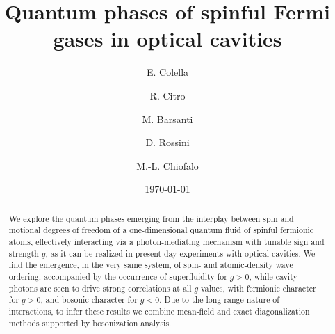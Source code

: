 \documentclass[pra,aps,superscriptaddress,twocolumn]{revtex4}
\begin{document}
\title{Quantum phases of spinful Fermi gases in optical cavities}

\author{E. Colella}

\author{R. Citro}

\author{M. Barsanti}

\author{D. Rossini}

\author{M.-L. Chiofalo}

\begin{abstract}
  We explore the quantum phases emerging from the interplay between spin and motional degrees of freedom of a
  one-dimensional quantum fluid of spinful fermionic atoms, effectively interacting via a photon-mediating mechanism with tunable sign and strength $g$,
  as it can be realized in present-day experiments with optical cavities. We find the emergence, in the very same system,
  of spin- and atomic-density wave ordering, accompanied by the occurrence of superfluidity for $g>0$, while cavity photons are seen
  to drive strong correlations at all $g$ values, with fermionic character for $g>0$, and bosonic character for $g<0$. Due to the long-range nature
  of interactions, to infer these results we combine mean-field and exact diagonalization methods supported by bosonization analysis.
\end{abstract}

\date{\today}

\maketitle
\end{document}
